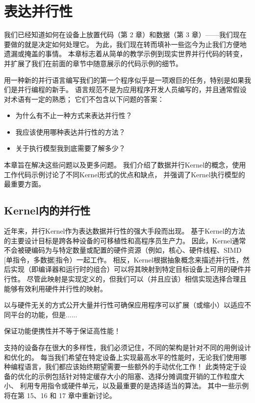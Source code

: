 \section{表达并行性}
我们已经知道如何在设备上放置代码（第 2 章）和数据（第 3 章）——我们现在要做的就是决定如何处理它。 
为此，我们现在转而填补一些迄今为止我们方便地遗漏或掩盖的事情。 
本章标志着从简单的教学示例到现实世界并行代码的转变，并扩展了我们在前面的章节中随意展示的代码示例的细节。

用一种新的并行语言编写我们的第一个程序似乎是一项艰巨的任务，特别是如果我们是并行编程的新手。 
语言规范不是为应用程序开发人员编写的，并且通常假设对术语有一定的熟悉； 它们不包含以下问题的答案：

\begin{itemize}
	\item 为什么有不止一种方式来表达并行性？

	\item 我应该使用哪种表达并行性的方法？

	\item 关于执行模型我到底需要了解多少？
\end{itemize}

本章旨在解决这些问题以及更多问题。 我们介绍了数据并行Kernel的概念，使用工作代码示例讨论了不同Kernel形式的优点和缺点，
并强调了Kernel执行模型的最重要方面。

\subsection{Kernel内的并行性}
近年来，并行Kernel作为表达数据并行性的强大手段而出现。 基于Kernel的方法的主要设计目标是跨各种设备的可移植性和高程序员生产力。 
因此，Kernel通常不会被硬编码为与特定数量或配置的硬件资源（例如，核心、硬件线程、SIMD [单指令，多数据]指令）一起工作。 
相反，Kernel根据抽象概念来描述并行性，然后实现（即编译器和运行时的组合）可以将其映射到特定目标设备上可用的硬件并行性。 
尽管此映射是实现定义的，但我们可以（并且应该）相信实现选择合理且能够有效利用硬件并行性的映射。

以与硬件无关的方式公开大量并行性可确保应用程序可以扩展（或缩小）以适应不同平台的功能，但是......

\begin{remark}
	保证功能便携性并不等于保证高性能！
\end{remark}

支持的设备存在很大的多样性，我们必须记住，不同的架构是针对不同的用例设计和优化的。 
每当我们希望在特定设备上实现最高水平的性能时，无论我们使用哪种编程语言，我们都应该始终期望需要一些额外的手动优化工作！ 
此类特定于设备的优化的示例包括针对特定缓存大小的阻塞、选择分摊调度开销的工作粒度大小、
利用专用指令或硬件单元，以及最重要的是选择适当的算法。 其中一些示例将在第 15、16 和 17 章中重新讨论。

